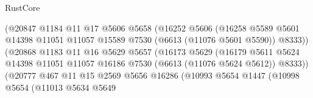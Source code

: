 \begin{lexlean}{RustCore}
\begin{coremodule}
                                      (@20847
                                        @1184
                                        @11
                                        @17
                                        @5606
                                        @5658
                                        (@16252
                                          @5606
                                          (@16258
                                            @5589
                                            @5601
                                            @14398
                                            @11051
                                            @11057
                                            @15589
                                            @7530
                                            (@6613 (@11076 @5601 @5590))
                                            @8333))
                                        (@20868
                                          @1183
                                          @11
                                          @16
                                          @5629
                                          @5657
                                          (@16173
                                            @5629
                                            (@16179
                                              @5611
                                              @5624
                                              @14398
                                              @11051
                                              @11057
                                              @16186
                                              @7530
                                              (@6613 (@11076 @5624 @5612))
                                              @8333))
                                          (@20777
                                            @467
                                            @11
                                            @15
                                            @2569
                                            @5656
                                            @16286
                                            (@10993
                                              @5654
                                              @1447
                                              (@10998
                                                @5654
                                                (@11013
                                                  @5634
                                                  @5649

\end{coremodule}
\end{lexlean}
